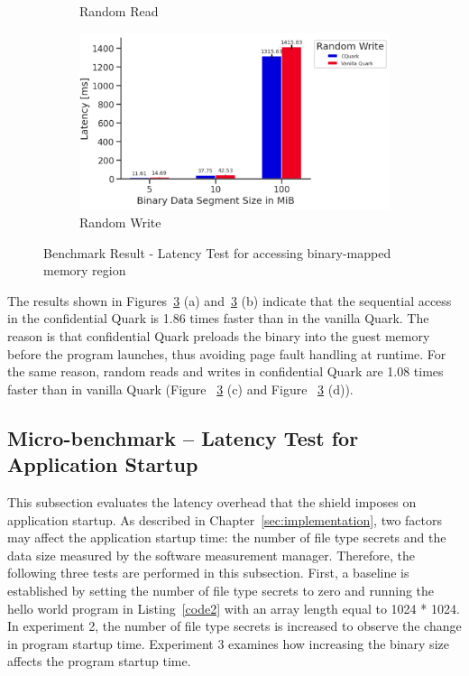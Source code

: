 \begin{figure}[!htb]
\begin{subfigure}[b]{0.5\linewidth}
      \caption{Random Read} 
      \label{fig7:c} 
    \end{subfigure}%
    \begin{subfigure}[b]{0.5\linewidth}
      \centering
      \includegraphics[width=0.9\linewidth]{images/Random_Write.PNG} 
      \caption{Random Write} 
      \label{fig7:d} 
    \end{subfigure} 
    \caption{Benchmark Result - Latency Test for accessing binary-mapped memory region}
    \label{fig7} 
\end{figure}



The results shown in Figures~\ref{fig7} (a) and~\ref{fig7} (b) indicate that the sequential access in the confidential Quark is 1.86 times faster than in the vanilla Quark. The reason is that confidential Quark preloads the binary into the guest memory before the program launches, thus avoiding page 
fault handling at runtime. For the same reason, random reads and writes in confidential Quark are 1.08 times faster than in vanilla Quark (Figure ~\ref{fig7} (c) and Figure ~\ref{fig7} (d)).


\subsection{Micro-benchmark – Latency Test for Application Startup}
\label{micro_app_start_up}

This subsection evaluates the latency overhead that the shield imposes on application startup. As described in Chapter~\ref{sec:implementation}, two factors may affect the application startup time: the number of file type secrets and the data size measured by the software measurement manager. Therefore, 
the following three tests are performed in this subsection. First, a baseline is established by setting the number of file type secrets to zero and running the hello world program in Listing~\ref{code2} with an array length equal to 1024 * 1024. 
In experiment 2, the number of file type secrets is increased to observe the change in program startup time. Experiment 3 examines how increasing the binary size affects the program startup time.


